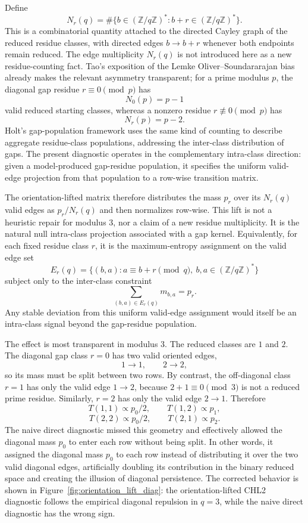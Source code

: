 \documentclass[10pt]{article}
\begin{document}
Define
\[
N_r(q)=\#\{b\in(\mathbb Z/q\mathbb Z)^*: b+r\in(\mathbb Z/q\mathbb Z)^*\}.
\]
This is a combinatorial quantity attached to the directed Cayley graph of the reduced residue classes, with directed edges $b\to b+r$ whenever both endpoints remain reduced.  The edge multiplicity $N_r(q)$ is not introduced here as a new residue-counting fact.  Tao's exposition of the Lemke Oliver--Soundararajan bias already makes the relevant asymmetry transparent; for a prime modulus $p$, the diagonal gap residue $r\equiv0\pmod p$ has
\[
N_0(p)=p-1
\]
valid reduced starting classes, whereas a nonzero residue $r\not\equiv0\pmod p$ has
\[
N_r(p)=p-2.
\]
Holt's gap-population framework uses the same kind of counting to describe aggregate residue-class populations, addressing the inter-class distribution of gaps.  The present diagnostic operates in the complementary intra-class direction: given a model-produced gap-residue population, it specifies the uniform valid-edge projection from that population to a row-wise transition matrix.

The orientation-lifted matrix therefore distributes the mass $p_r$ over its $N_r(q)$ valid edges as $p_r/N_r(q)$ and then normalizes row-wise.  This lift is not a heuristic repair for modulus $3$, nor a claim of a new residue multiplicity.  It is the natural null intra-class projection associated with a gap kernel.  Equivalently, for each fixed residue class $r$, it is the maximum-entropy assignment on the valid edge set
\[
E_r(q)=\{(b,a):a\equiv b+r\pmod q,\ b,a\in(\mathbb Z/q\mathbb Z)^*\}
\]
subject only to the inter-class constraint
\[
\sum_{(b,a)\in E_r(q)} m_{b,a}=p_r.
\]
Any stable deviation from this uniform valid-edge assignment would itself be an intra-class signal beyond the gap-residue population.

The effect is most transparent in modulus $3$.  The reduced classes are $1$ and $2$.  The diagonal gap class $r=0$ has two valid oriented edges,
\[
1\to1,
\qquad
2\to2,
\]
so its mass must be split between two rows.  By contrast, the off-diagonal class $r=1$ has only the valid edge $1\to2$, because $2+1\equiv0\pmod3$ is not a reduced prime residue.  Similarly, $r=2$ has only the valid edge $2\to1$.  Therefore
\[
T(1,1)\propto p_0/2,
\qquad
T(1,2)\propto p_1,
\]
\[
T(2,2)\propto p_0/2,
\qquad
T(2,1)\propto p_2.
\]
The naive direct diagnostic missed this geometry and effectively allowed the diagonal mass $p_0$ to enter each row without being split.  In other words, it assigned the diagonal mass $p_0$ to each row instead of distributing it over the two valid diagonal edges, artificially doubling its contribution in the binary reduced space and creating the illusion of diagonal persistence.  The corrected behavior is shown in Figure~\ref{fig:orientation_lift_diag}: the orientation-lifted CHL2 diagnostic follows the empirical diagonal repulsion in $q=3$, while the naive direct diagnostic has the wrong sign.
\end{document}
